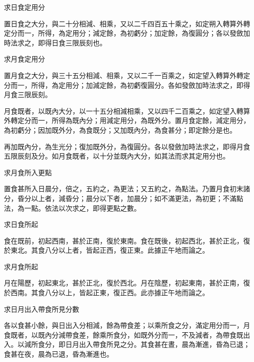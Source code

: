 \begin{pinyinscope}
 求日食定用分



 置日食之大分，與二十分相減、相乘，又以二千四百五十乘之，如定朔入轉算外轉定分而一，所得，為定用分；減定餘，為初虧分；加定餘，為復圓分；各以發斂加時法求之，即得日食三限辰刻也。



 求月食定用分



 置月食之大分，與三十五分相減、相乘，又以二千一百乘之，如定望入轉算外轉定分而一，所得，為定用分；加減定餘，為初虧復圓分。各如發斂加時法求之，即得月食三限辰刻。



 月食既者，以既內大分，以一十五分相減相乘，又以四千二百乘之，如定望入轉算外轉定分而一，所得為既內分；用減定用分，為既外分。置月食定餘，減定用分，為初虧分；因加既外分，為食既分；又加既內分，為食甚分；即定餘分是也。



 再加既內分，為生光分；復加既外分，為復圓分。各以發斂加時法求之，即得月食五限辰刻及分。如月食既者，以十分並既內大分，如其法而求其定用分也。



 求月食所入更點



 置食甚所入日晨分，倍之，五約之，為更法；又五約之，為點法。乃置月食初末諸分，昏分以上者，減昏分；晨分以下者，加晨分；如不滿更法，為初更；不滿點法，為一點。依法以次求之，即得更點之數。



 求日食所起



 食在既前，初起西南，甚於正南，復於東南。食在既後，初起西北，甚於正北，復於東北。其食八分以上者，皆起正西，復正東。此據正午地而論之。



 求月食所起



 月在陽歷，初起東北，甚於正北，復於西北。月在陰歷，初起東南，甚於正南，復於西南。其食八分以上，皆起正東，復正西。此亦據正午地而論之。



 求日月出入帶食所見分數



 各以食甚小餘，與日出入分相減，餘為帶食差；以乘所食之分，滿定用分而一，月食既者，以既內分減帶食差，餘乘所食分，如既外分而一，不及減者，為帶食既出入。以減所食分，即日月出入帶食所見之分。其食甚在晝，晨為漸進，昏為已退；食甚在夜，晨為已退，昏為漸進也。




\end{pinyinscope}
